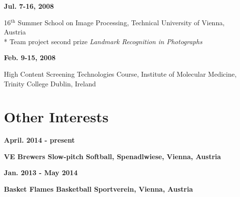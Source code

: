 \documentclass[line,a4paper]{resume}
\newcommand{\superscript}[1]{\ensuremath{^{\text{#1}}}}
\begin{document}
\begin{resume}
\noindent
\begin{minipage}[t]{0.20\linewidth}
\textbf{Jul. 7-16, 2008}
\end{minipage}
\begin{minipage}[t]{0.80\linewidth}\raggedright
16\superscript{th} Summer School on Image Processing, Technical University of Vienna, Austria\\*
Team project second prize \emph{Landmark Recognition in Photographs}
\end{minipage}

\noindent
\begin{minipage}[t]{0.20\linewidth}
\textbf{Feb. 9-15, 2008}
\end{minipage}
\begin{minipage}[t]{0.80\linewidth}\raggedright
High Content Screening Technologies Course, Institute of Molecular Medicine, Trinity College Dublin, Ireland
\end{minipage}
    \section{\mysidestyle Other Interests}\vspace{2mm}

		\noindent
		\begin{minipage}[t]{0.25\linewidth}
		\textbf{April. 2014 - present}
		\end{minipage}
		\begin{minipage}[t]{0.75\linewidth}\raggedright
		\textbf{VE Brewers Slow-pitch Softball, Spenadlwiese, Vienna, Austria}
		\end{minipage}

		\noindent
		\begin{minipage}[t]{0.25\linewidth}
		\textbf{Jan. 2013 - May 2014}
		\end{minipage}
		\begin{minipage}[t]{0.75\linewidth}\raggedright
		\textbf{Basket Flames Basketball Sportverein, Vienna, Austria}
		\end{minipage}



\end{resume}
\end{document}
